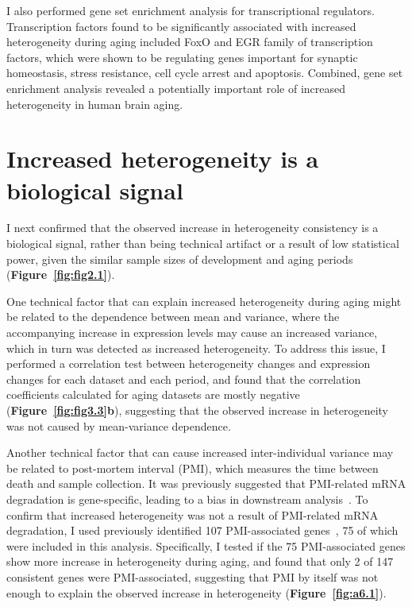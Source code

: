 I also performed gene set enrichment analysis for transcriptional regulators. Transcription factors found to be significantly associated with increased heterogeneity during aging included FoxO and EGR family of transcription factors, 
which were shown to be regulating genes important for synaptic homeostasis, stress resistance, cell cycle arrest and apoptosis.
Combined, gene set enrichment analysis revealed a potentially important role of increased heterogeneity in human brain aging.

\section{Increased heterogeneity is a biological signal}
I next confirmed that the observed increase in heterogeneity consistency is a biological signal, rather than being technical artifact or a result of low statistical power, 
given the similar sample sizes of development and aging periods (\textbf{Figure~\ref{fig:fig2.1}}).

One technical factor that can explain increased heterogeneity during aging might be related to the dependence between mean and variance, 
where the accompanying increase in expression levels may cause an increased variance, which in turn was detected as increased heterogeneity.
To address this issue, I performed a correlation test between heterogeneity changes and expression changes for each dataset and each period, 
and found that the correlation coefficients calculated for aging datasets are mostly negative (\textbf{Figure~\ref{fig:fig3.3}b}), 
suggesting that the observed increase in heterogeneity was not caused by mean-variance dependence.

Another technical factor that can cause increased inter-individual variance may be related to post-mortem interval (PMI), 
which measures the time between death and sample collection.
It was previously suggested that PMI-related mRNA degradation is gene-specific, leading to a bias in downstream analysis~\cite{Zhu2017}.
To confirm that increased heterogeneity was not a result of PMI-related mRNA degradation,
I used previously identified 107 PMI-associated genes~\cite{Zhu2017}, 75 of which were included in this analysis.
Specifically, I tested if the 75 PMI-associated genes show more increase in heterogeneity during aging,
and found that only 2 of 147 consistent genes were PMI-associated, 
suggesting that PMI by itself was not enough to explain the observed increase in heterogeneity (\textbf{Figure~\ref{fig:a6.1}}).

